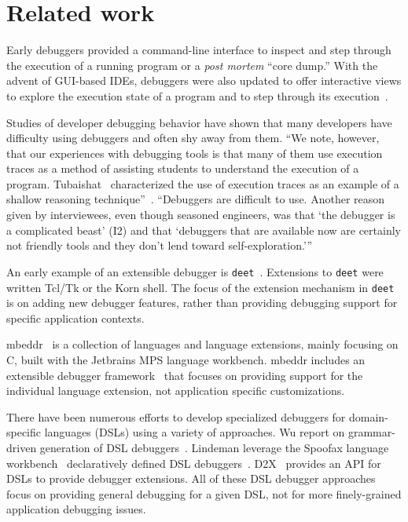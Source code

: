 \documentclass[sigplan,anonymous,review,10pt]{acmart}
\newcommand\deet{{\tt deet}\xspace}
\begin{document}
\section{Related work}\label{sec:related}


Early debuggers provided a command-line interface to inspect and step through the execution of a running program or a \emph{post mortem} ``core dump.''
With the advent of GUI-based IDEs, debuggers were also updated to offer interactive views to explore the execution state of a program and to step through its execution~\cite{Rose96a}.


Studies of developer debugging behavior have shown that many developers have difficulty using debuggers and often shy away from them.
``We note, however, that our experiences with debugging tools is that many of them use execution traces as a method of assisting students to understand the execution of a program. Tubaishat~\cite{Tuba01a} characterized the use of execution traces as an example of a shallow reasoning technique''~\cite{McCa08a}.
``Debuggers are difficult to use. Another reason given by interviewees, even though seasoned engineers, was that `the debugger is a complicated beast' (I2) and that `debuggers that are available now are certainly not friendly tools and they don't lend toward self-exploration.'''
\cite{Bell18a}

An early example of an extensible debugger is \deet~\cite{Hans97a}.
Extensions to \deet were written Tcl/Tk or the Korn shell.
The focus of the extension mechanism in \deet is on adding new debugger features, rather than providing debugging support for specific application contexts.

mbeddr~\cite{Voel17a} is a collection of languages and language extensions, mainly focusing on C, built with the Jetbrains MPS language workbench.
mbeddr includes an extensible debugger framework~\cite{Pavl15a} that focuses on providing support for the individual language extension, not application specific customizations.

There have been numerous efforts to develop specialized debuggers for domain-specific languages (DSLs) using a variety of approaches.
Wu \etal report on grammar-driven generation of DSL debuggers~\cite{HuiW08a}.
Lindeman \etal leverage the Spoofax language workbench~\cite{Kats10a} declaratively defined DSL debuggers~\cite{Lind11a}.
D2X~\cite{Brah23a} provides an API for DSLs to provide debugger extensions.
All of these DSL debugger approaches focus on providing general debugging for a given DSL, not for more finely-grained application debugging issues.
\end{document}
